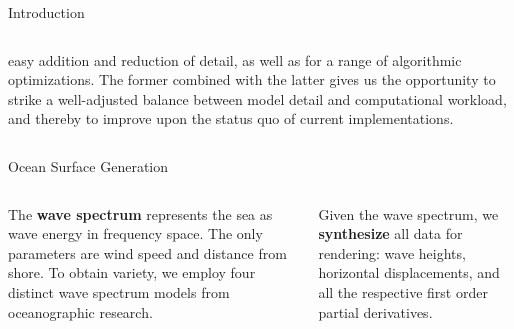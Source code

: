 \documentclass[final,hyperref={pdfpagelabels=true}]{beamer}
\begin{document}
\begin{frame}[fragile]
\begin{center}
\begin{minipage}{\textwidth}
\begin{block}{Introduction}
\begin{columns}[t]
\begin{column}{0.45\linewidth}
					easy addition and reduction of detail, as well as for a range of algorithmic
					optimizations. The former combined with the latter gives us the opportunity to
					strike a well-adjusted balance between model detail and computational workload,
					and thereby to improve upon the status quo of current implementations.
				\end{column}	  
			\end{columns}
		\end{block}
	\end{minipage}
	\begin{minipage}{\textwidth}
		\begin{block}{Ocean Surface Generation}	
			\begin{columns}[t]
				\begin{column}{0.45\linewidth}
					The \textbf{wave spectrum} represents the sea as wave energy in frequency space.
					The only parameters are wind speed and distance from shore.
					To obtain variety, we employ four distinct wave spectrum models from
					oceanographic research.
					\begin{figure}
					\centering
					\end{figure}
				\end{column}
				\begin{column}{0.45\linewidth}
					Given the wave spectrum, we \textbf{synthesize} all data for rendering:
					wave heights, horizontal displacements, and all the respective first order
					partial derivatives.
					\begin{figure}
					 \centering
\end{figure}
\end{column}
\end{columns}
\end{block}
\end{minipage}
\end{center}
\end{frame}
\end{document}
